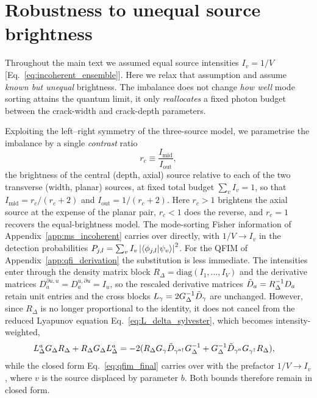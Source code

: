 \documentclass[reprint,amsmath,amssymb,aps,prl,floatfix,groupedaddress,superscriptaddress]{revtex4-2}
\begin{document}
\section{{\color{red}Robustness to unequal source brightness}\label{app:unequal_intensities}}
{\color{red}
Throughout the main text we assumed equal source intensities $I_v=1/V$ [Eq.~\eqref{eq:incoherent_ensemble}]. Here we relax that assumption and assume \emph{known but unequal} brightness. The imbalance does not change \emph{how well} mode sorting attains the quantum limit, it only \emph{reallocates} a fixed photon budget between the crack-width and crack-depth parameters.

Exploiting the left--right symmetry of the three-source model, we parametrise the imbalance by a single \emph{contrast} ratio
\begin{equation}
r_c \equiv \frac{I_{\mathrm{mid}}}{I_{\mathrm{out}}},
\end{equation}
the brightness of the central (depth, axial) source relative to each of the two transverse (width, planar) sources, at fixed total budget $\sum_v I_v = 1$, so that $I_{\mathrm{mid}}=r_c/(r_c+2)$ and $I_{\mathrm{out}}=1/(r_c+2)$. Here $r_c>1$ brightens the axial source at the expense of the planar pair, $r_c<1$ does the reverse, and $r_c=1$ recovers the equal-brightness model.
{\color{red}The mode-sorting Fisher information of Appendix~\ref{app:ms_incoherent} carries over directly, with $1/V\to I_v$ in the detection probabilities $P_{j,l}=\sum_v I_v\,\abs{\braket{\phi_{j,l}}{\psi_v}}^2$. For the QFIM of Appendix~\ref{app:qfi_derivation} the substitution is less immediate. The intensities enter through the density matrix block $R_\Delta=\mathrm{diag}(I_1,\dots,I_V)$ and the derivative matrices $D_a^{\partial u,u} = D_a^{u,\partial u} = I_u$, so the rescaled derivative matrices $\Tilde{D}_a = R_\Delta^{-1} D_a$ retain unit entries and the cross blocks $L_\gamma = 2 G^{-1}_\Delta \Tilde{D}_\gamma$ are unchanged. However, since $R_\Delta$ is no longer proportional to the identity, it does not cancel from the reduced Lyapunov equation Eq.~\eqref{eq:L_delta_sylvester}, which becomes intensity-weighted,
\begin{align}
    L^a_{\Delta} G_{\Delta} R_\Delta + R_\Delta G_{\Delta} L^a_{\Delta}  &= -2 (R_\Delta G_{\gamma}\Tilde{D}_{\gamma^{a\dagger}}G_\Delta^{-1} + G_\Delta^{-1} \Tilde{D}_{\gamma^a}G_{\gamma^\dagger} R_\Delta),
    \label{eq:L_delta_sylvester_weighted}
\end{align}
while the closed form Eq.~\eqref{eq:qfim_final} carries over with the prefactor $1/V \to I_{v}$, where $v$ is the source displaced by parameter $b$. Both bounds therefore remain in closed form.}

}
\end{document}
